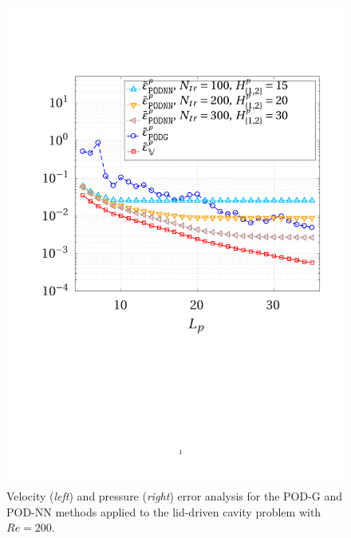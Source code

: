 \documentclass[12pt, a4paper, twoside, openright, notitlepage]{report}
\numberwithin{equation}{chapter}
\theoremstyle{theorem}
\theoremstyle{definition}
\theoremstyle{remark}
\theoremstyle{proposition}
\numberwithin{figure}{chapter}
\begin{document}
\begin{figure}[b!]
			\includegraphics[scale = 0.44, trim = {2cm 9cm 1.5cm 3.5cm}, clip]{dc_200_p_error_vs_rank}
			
			\caption{Velocity (\emph{left}) and pressure (\emph{right}) error analysis for the POD-G and POD-NN methods applied to the lid-driven cavity problem with $Re = 200$.}
			\label{fig:dc-200-error-analysis}
		\end{figure}
		
\end{document}
